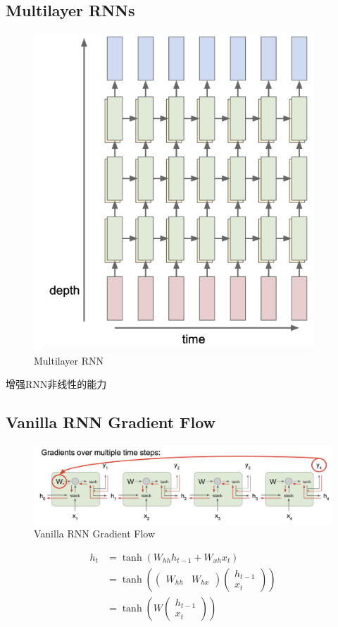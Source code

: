 	\subsection{Multilayer RNNs}
	\begin{figure}[htbp]
		\centering
		\includegraphics[scale=0.35]{figures/multilayer_rnn.png}
		\caption{Multilayer RNN}
	\end{figure}

	增强RNN非线性的能力
	
	\subsection{Vanilla RNN Gradient Flow}

	\begin{figure}[H]
		\centering
		\includegraphics[scale=0.3]{figures/RNN_grad_van.png}
		\caption{Vanilla RNN Gradient Flow}
	\end{figure}

	\[
	\begin{aligned}
		h_{t}& =\tanh(W_{hh}h_{t-1}+W_{xh}x_{t})  \\
		&=\tanh\left(\begin{pmatrix}W_{hh}&W_{hx}\end{pmatrix}\begin{pmatrix}h_{t-1}\\x_t\end{pmatrix}\right) \\
		&=\tanh\left(W\begin{pmatrix}h_{t-1}\\x_t\end{pmatrix}\right)
		\end{aligned}	
	\]
	

